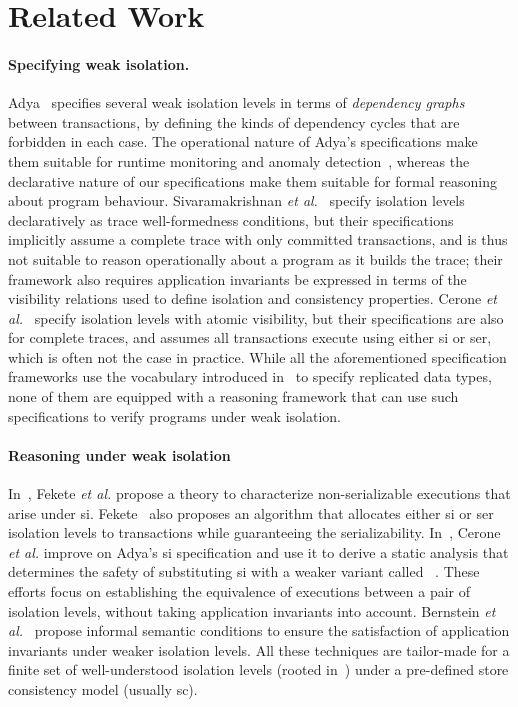 \section{Related Work}
\label{sec:relatedwork}

\paragraph{Specifying weak isolation.}
Adya~\cite{adyaphd} specifies several weak isolation levels in terms
of \emph{dependency graphs} between transactions, by defining the
kinds of dependency cycles that are forbidden in each case. The
operational nature of Adya's specifications make them suitable for
runtime monitoring and anomaly
detection~\cite{kemmevldb,feketesigmod08,pssi2011}, whereas the
declarative nature of our specifications make them suitable for formal
reasoning about program behaviour. Sivaramakrishnan \emph{et
  al.}~\cite{pldi15} specify isolation levels declaratively as trace
well-formedness conditions, but their specifications implicitly assume
a complete trace with only committed transactions, and is thus not
suitable to reason operationally about a program as it builds the
trace; their framework also requires application invariants be
expressed in terms of the visibility relations used to define
isolation and consistency properties.  Cerone \emph{et
  al.}~\cite{gotsmanconcur15} specify isolation levels with atomic
visibility, but their specifications are also for complete traces, and
assumes all transactions execute using either {\sc si} or {\sc ser},
which is often not the case in practice. While all the aforementioned
specification frameworks use the vocabulary introduced
in~\cite{burckhardt14} to specify replicated data types, none of them
are equipped with a reasoning framework that can use such
specifications to verify programs under weak isolation.

\paragraph{Reasoning under weak isolation} In~\cite{feketessi}, Fekete
\emph{et al.} propose a theory to characterize non-serializable
executions that arise under {\sc si}. Fekete~\cite{fekete2005} also
proposes an algorithm that allocates either {\sc si} or {\sc ser}
isolation levels to transactions while guaranteeing the
serializability. In~\cite{gotsmanpodc16}, Cerone \emph{et al.} improve
on Adya's {\sc si} specification and use it to derive a static
analysis that determines the safety of substituting {\sc si} with a
weaker variant called ~\cite{psi}.
These efforts focus on establishing the equivalence of executions
between a pair of isolation levels, without taking application
invariants into account.  Bernstein \emph{et al.}~\cite{bern2000}
propose informal semantic conditions to ensure the satisfaction of
application invariants under weaker isolation levels.  All these
techniques are tailor-made for a finite set of well-understood
isolation levels (rooted in~\cite{berenson}) under a pre-defined store
consistency model (usually {\sc sc}).

